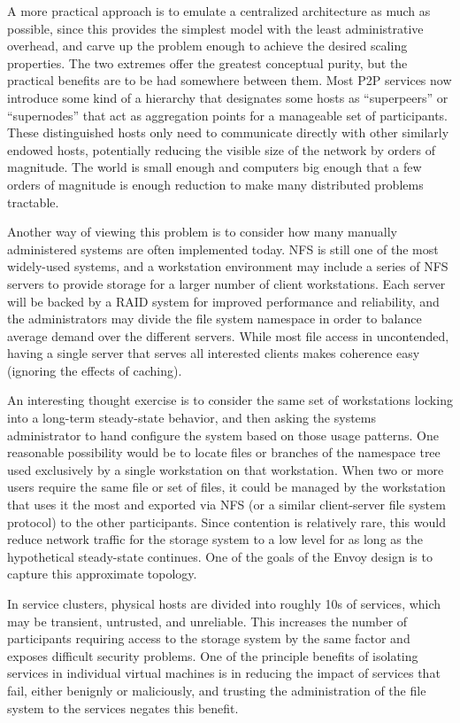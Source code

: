 A more practical approach is to emulate a centralized architecture as much as possible, since this provides the simplest model with the least administrative overhead, and carve up the problem enough to achieve the desired scaling properties. The two extremes offer the greatest conceptual purity, but the practical benefits are to be had somewhere between them. Most P2P services now introduce some kind of a hierarchy that designates some hosts as ``superpeers'' or ``supernodes'' that act as aggregation points for a manageable set of participants. These distinguished hosts only need to communicate directly with other similarly endowed hosts, potentially reducing the visible size of the network by orders of magnitude. The world is small enough and computers big enough that a few orders of magnitude is enough reduction to make many distributed problems tractable.

Another way of viewing this problem is to consider how many manually administered systems are often implemented today. NFS \cite{callaghan} is still one of the most widely-used systems, and a workstation environment may include a series of NFS servers to provide storage for a larger number of client workstations. Each server will be backed by a RAID \cite{patterson} system for improved performance and reliability, and the administrators may divide the file system namespace in order to balance average demand over the different servers. While most file access in uncontended, having a single server that serves all interested clients makes coherence easy (ignoring the effects of caching).

An interesting thought exercise is to consider the same set of workstations locking into a long-term steady-state behavior, and then asking the systems administrator to hand configure the system based on those usage patterns. One reasonable possibility would be to locate files or branches of the namespace tree used exclusively by a single workstation on that workstation. When two or more users require the same file or set of files, it could be managed by the workstation that uses it the most and exported via NFS (or a similar client-server file system protocol) to the other participants. Since contention is relatively rare, this would reduce network traffic for the storage system to a low level for as long as the hypothetical steady-state continues. One of the goals of the Envoy design is to capture this approximate topology.

In service clusters, physical hosts are divided into roughly 10s of services, which may be transient, untrusted, and unreliable. This increases the number of participants requiring access to the storage system by the same factor and exposes difficult security problems. One of the principle benefits of isolating services in individual virtual machines is in reducing the impact of services that fail, either benignly or maliciously, and trusting the administration of the file system to the services negates this benefit.

